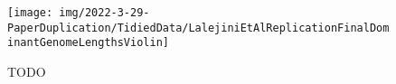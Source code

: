 \begin{figure}
    \centering
    \texttt{[image: img/2022-3-29-PaperDuplication/TidiedData/LalejiniEtAlReplicationFinalDominantGenomeLengthsViolin]}
    \caption{TODO} \label{fig:LalejiniEtAlReplicationFinalDominantGenomeLengthsViolin}
\end{figure}
